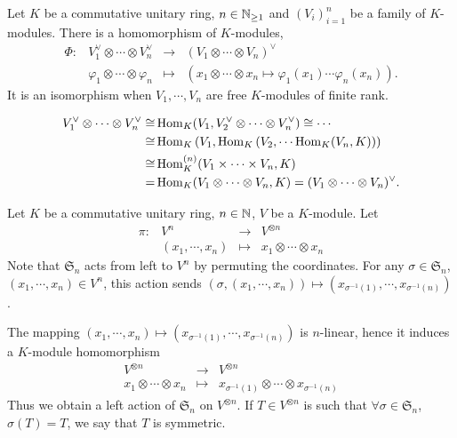 \begin{propositionenv}
    Let $K$ be a commutative unitary ring, $n \in \mathbb{N}_{\ge 1}$ and $(V_{i})_{i=1}^n$ be a family of $K$-modules.
    There is a homomorphism of $K$-modules,
    $$\begin{array}{rrcl}
        \Phi : & V_1^\vee \otimes \cdots \otimes V_n^\vee & \longrightarrow & (V_1 \otimes \cdots \otimes V_n)^\vee\\
        & \varphi_1 \otimes \cdots \otimes \varphi_n & \longmapsto & (x_1 \otimes \cdots \otimes x_n \mapsto \varphi_1(x_1) \cdots \varphi_n(x_n)).
    \end{array}$$
    It is an isomorphism when $V_1,\cdots,V_n$ are free $K$-modules of finite rank.
\end{propositionenv}
\begin{proofenv}
    $$\begin{aligned}
        V_1^\vee \otimes \cdots \otimes V_n^\vee \cong & \operatorname{\mathrm{Hom}}_{K} (V_1,V_2^\vee \otimes \cdots \otimes V_n^\vee) \cong \cdots\\
        \cong & \operatorname{\mathrm{Hom}}_{K}\left(V_1,\operatorname{\mathrm{Hom}}_{K}\left(V_2,\cdots \operatorname{\mathrm{Hom}}_{K}(V_n,K)\right)\right)\\
        \cong &  \operatorname{\mathrm{Hom}}_{K}^{(n)} (V_1\times \cdots \times V_n,K)\\
        = & \operatorname{\mathrm{Hom}}_{K}(V_1 \otimes \cdots \otimes V_n, K) = (V_1\otimes \cdots \otimes V_n)^\vee.
    \end{aligned}$$
\end{proofenv}

\begin{definitionenv}
    Let $K$ be a commutative unitary ring, $n \in \mathbb{N}$, $V$ be a $K$-module.
    Let
    $$\begin{array}{rrcl}
        \pi : & V^n & \longrightarrow & V^{\otimes n}\\
        & (x_1,\cdots,x_n) & \longmapsto & x_1 \otimes \cdots \otimes x_n
    \end{array}$$
    Note that $\mathfrak{S}_n$ acts from left to $V^n$ by permuting the coordinates.
    For any $\sigma \in \mathfrak{S}_n$, $(x_1,\cdots,x_n) \in V^n$, this action sends
    $(\sigma,(x_1,\cdots,x_n)) \mapsto (x_{\sigma^{-1}(1)},\cdots,x_{\sigma^{-1}(n)})$.

    \quad The mapping $(x_1,\cdots,x_n) \mapsto (x_{\sigma^{-1}(1)},\cdots,x_{\sigma^{-1}(n)})$ is $n$-linear, hence it induces a $K$-module homomorphism
    $$\begin{array}{rcl}
        V^{\otimes n} & \longrightarrow & V^{\otimes n}\\
        x_1 \otimes \cdots \otimes x_n & \longmapsto & x_{\sigma^{-1}(1)} \otimes \cdots \otimes x_{\sigma^{-1}(n)}
    \end{array}$$
    Thus we obtain a left action of $\mathfrak{S}_n$ on $V^{\otimes n}$.
    If $T \in V^{\otimes n}$ is such that $\forall \sigma \in \mathfrak{S}_n$, $\sigma(T) = T$, we say that $T$ is symmetric.
\end{definitionenv}

